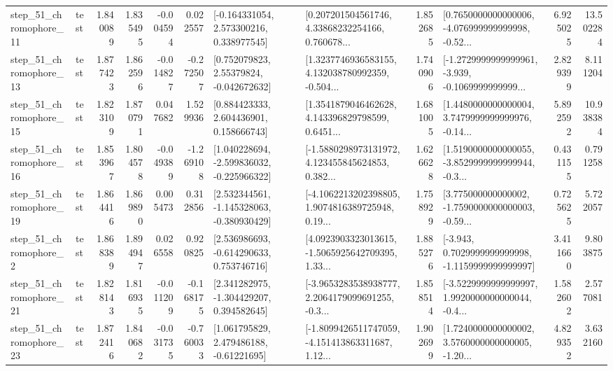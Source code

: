 \begin{tabular}{llrrrrllrlrr}
   step\_51\_chromophore\_11 &      test &      1.840089 &    1.835495 &     -0.004594 &  0.022557 &    [-0.164331054, 2.573300216, 0.338977545] &  [0.207201504561746, 4.33868232254166, 0.760678... &       1.852685 &  [0.7650000000000006, -4.076999999999998, -0.52... &            6.925025 &         13.502284 \\
   step\_51\_chromophore\_13 &      test &      1.877423 &    1.862596 &     -0.014827 & -0.272507 &     [0.752079823, 2.55379824, -0.042672632] &  [1.3237746936583155, 4.132038780992359, -0.504... &       1.740906 &  [-1.2729999999999961, -3.939, -0.1069999999999... &            2.829399 &          8.111204 \\
   step\_51\_chromophore\_15 &      test &      1.823109 &    1.870791 &      0.047682 &  1.529936 &     [0.884423333, 2.604436901, 0.158666743] &  [1.3541879046462628, 4.143396829798599, 0.6451... &       1.681005 &  [1.4480000000000004, 3.7479999999999976, -0.14... &            5.892592 &         10.938384 \\
   step\_51\_chromophore\_16 &      test &      1.853967 &    1.804578 &     -0.049389 & -1.269108 &   [1.040228694, -2.599836032, -0.225966322] &  [-1.5880298973131972, 4.123455845624853, 0.382... &       1.626628 &  [1.5190000000000055, -3.8529999999999944, -0.3... &            0.431155 &          0.791258 \\
   step\_51\_chromophore\_19 &      test &      1.864416 &    1.869890 &      0.005473 &  0.312856 &   [2.532344561, -1.145328063, -0.380930429] &  [-4.1062213202398805, 1.9074816389725948, 0.19... &       1.758929 &  [3.775000000000002, -1.7590000000000003, -0.59... &            0.725625 &          5.722057 \\
    step\_51\_chromophore\_2 &      test &      1.868389 &    1.894947 &      0.026558 &  0.920825 &    [2.536986693, -0.614290633, 0.753746716] &  [4.0923903323013615, -1.5065925642709395, 1.33... &       1.885276 &  [-3.943, 0.7029999999999998, -1.1159999999999997] &            3.411660 &          9.803875 \\
   step\_51\_chromophore\_21 &      test &      1.828143 &    1.816935 &     -0.011209 & -0.168175 &    [2.341282975, -1.304429207, 0.394582645] &  [-3.9653283538938777, 2.2064179099691255, -0.3... &       1.858514 &  [-3.5229999999999997, 1.9920000000000044, -0.4... &            1.582602 &          2.577081 \\
   step\_51\_chromophore\_23 &      test &      1.872416 &    1.840682 &     -0.031735 & -0.760033 &     [1.061795829, 2.479486188, -0.61221695] &  [-1.8099426511747059, -4.151413863311687, 1.12... &       1.902699 &  [1.7240000000000002, 3.5760000000000005, -1.20... &            4.829352 &          3.632160 \\

\end{tabular}
